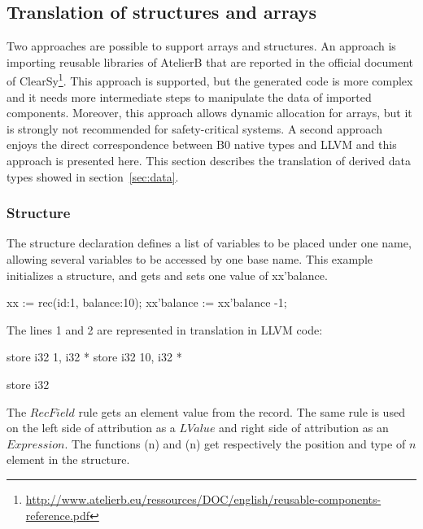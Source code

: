 

\subsection{Translation of structures and arrays}
\label{sec:StructArray}

Two approaches are possible to support arrays and structures. An approach is 
importing reusable libraries of AtelierB that are reported in the official 
document of ClearSy\footnote{\url{http://www.atelierb.eu/ressources/DOC/english/reusable-components-reference.pdf}}. 
This approach is supported, but the generated code is more complex and it needs 
more intermediate steps to manipulate the data of imported components. 
Moreover, this approach allows dynamic allocation for arrays, but it is 
strongly not recommended for safety-critical systems. A second approach enjoys 
the direct correspondence between B0 native types and LLVM and this approach 
is presented here. This section describes the translation of derived data 
types showed in section~\ref{sec:data}.


\subsubsection{Structure} 
The structure declaration defines a list of variables to be placed under one 
name, allowing several variables to be accessed by one base name. This example  
initializes a structure, and gets and sets one value of xx'balance. 
 
\begin{pascalcode}
xx := rec(id:1, balance:10);
xx'balance := xx'balance -1;
\end{pascalcode}

The lines 1 and 2 are represented in translation in LLVM code:

\begin{llvmcode}
store i32 1, i32 * %
store i32 10, i32 * %

store i32 %
\end{llvmcode}

The $RecField$ rule gets an element value from the record. The same rule is 
used on the left side of attribution as a $LValue$ and right side of 
attribution as an $Expression$. The functions \SBPos(n) and \SBType(n)  get 
respectively the position and type of $n$ element in the structure. 

